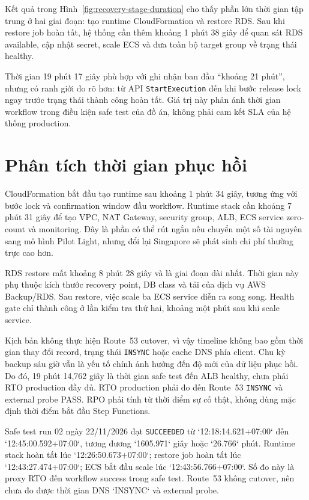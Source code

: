 Kết quả trong Hình~\ref{fig:recovery-stage-duration} cho thấy phần lớn thời gian tập trung ở hai giai đoạn: tạo runtime CloudFormation và restore RDS. Sau khi restore job hoàn tất, hệ thống cần thêm khoảng 1 phút 38 giây để quan sát RDS available, cập nhật secret, scale ECS và đưa toàn bộ target group về trạng thái healthy.

Thời gian 19 phút 17 giây phù hợp với ghi nhận ban đầu ``khoảng 21 phút'', nhưng có ranh giới đo rõ hơn: từ API \texttt{StartExecution} đến khi bước release lock ngay trước trạng thái thành công hoàn tất. Giá trị này phản ánh thời gian workflow trong điều kiện safe test của đồ án, không phải cam kết SLA của hệ thống production.

\section{Phân tích thời gian phục hồi}

CloudFormation bắt đầu tạo runtime sau khoảng 1 phút 34 giây, tương ứng với bước lock và confirmation window đầu workflow. Runtime stack cần khoảng 7 phút 31 giây để tạo VPC, NAT Gateway, security group, ALB, ECS service zero-count và monitoring. Đây là phần có thể rút ngắn nếu chuyển một số tài nguyên sang mô hình Pilot Light, nhưng đổi lại Singapore sẽ phát sinh chi phí thường trực cao hơn.

RDS restore mất khoảng 8 phút 28 giây và là giai đoạn dài nhất. Thời gian này phụ thuộc kích thước recovery point, DB class và tải của dịch vụ AWS Backup/RDS. Sau restore, việc scale ba ECS service diễn ra song song. Health gate chỉ thành công ở lần kiểm tra thứ hai, khoảng một phút sau khi scale service.

Kịch bản không thực hiện Route~53 cutover, vì vậy timeline không bao gồm thời gian thay đổi record, trạng thái \texttt{INSYNC} hoặc cache DNS phía client. Chu kỳ backup sáu giờ vẫn là yếu tố chính ảnh hưởng đến độ mới của dữ liệu phục hồi. Do đó, 19 phút 14,762 giây là thời gian safe test đến ALB healthy, chưa phải RTO production đầy đủ. RTO production phải đo đến Route~53 \texttt{INSYNC} và external probe PASS. RPO phải tính từ thời điểm sự cố thật, không dùng mặc định thời điểm bắt đầu Step Functions.

Safe test run 02 ngày 22/11/2026 đạt \texttt{SUCCEEDED} từ `12:18:14.621+07:00` đến `12:45:00.592+07:00`, tương đương `1605.971` giây hoặc `26.766` phút. Runtime stack hoàn tất lúc `12:26:50.673+07:00`; restore job hoàn tất lúc `12:43:27.474+07:00`; ECS bắt đầu scale lúc `12:43:56.766+07:00`. Số đo này là proxy RTO đến workflow success trong safe test. Route~53 không cutover, nên chưa đo được thời gian DNS `INSYNC` và external probe.

